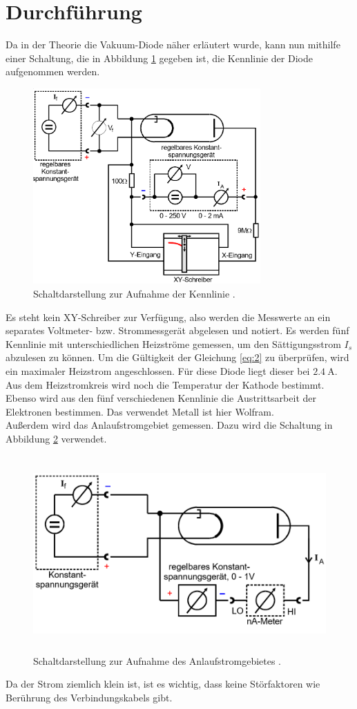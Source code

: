 \section{Durchführung}
Da in der Theorie die Vakuum-Diode näher erläutert wurde, kann nun mithilfe
einer Schaltung, die in Abbildung \ref{abb:4} gegeben ist, die Kennlinie
der Diode aufgenommen werden.
\begin{figure}[H]
  \centering
  \includegraphics[width=10 cm, height= 7.5cm]{content/Aufbau1.png}
  \caption{Schaltdarstellung zur Aufnahme der Kennlinie \cite{1}.}
  \label{abb:4}
\end{figure}
Es steht kein XY-Schreiber zur Verfügung, also werden die Messwerte an ein separates Voltmeter-
bzw. Strommessgerät abgelesen und notiert.
Es werden fünf Kennlinie mit unterschiedlichen Heizströme gemessen, um den Sättigungsstrom
$I_s$ abzulesen zu können.
Um die Gültigkeit der Gleichung \ref{eq:2} zu überprüfen, wird ein maximaler Heizstrom
angeschlossen. Für diese Diode liegt dieser bei $\SI{2.4}{\ampere}$.
Aus dem Heizstromkreis wird noch die Temperatur der Kathode bestimmt.
Ebenso wird aus den fünf verschiedenen Kennlinie die Austrittsarbeit der Elektronen bestimmen.
Das verwendet Metall ist hier Wolfram.\\
Außerdem wird das Anlaufstromgebiet gemessen. Dazu wird die Schaltung in Abbildung \ref{abb:5}
verwendet.
\begin{figure}[H]
  \centering
  \includegraphics[width=10 cm, height= 7.5cm]{content/Aufbau2.png}
  \caption{Schaltdarstellung zur Aufnahme des Anlaufstromgebietes \cite{1}.}
  \label{abb:5}
\end{figure}
Da der Strom ziemlich klein ist, ist es wichtig, dass keine Störfaktoren wie Berührung des
Verbindungskabels gibt.
